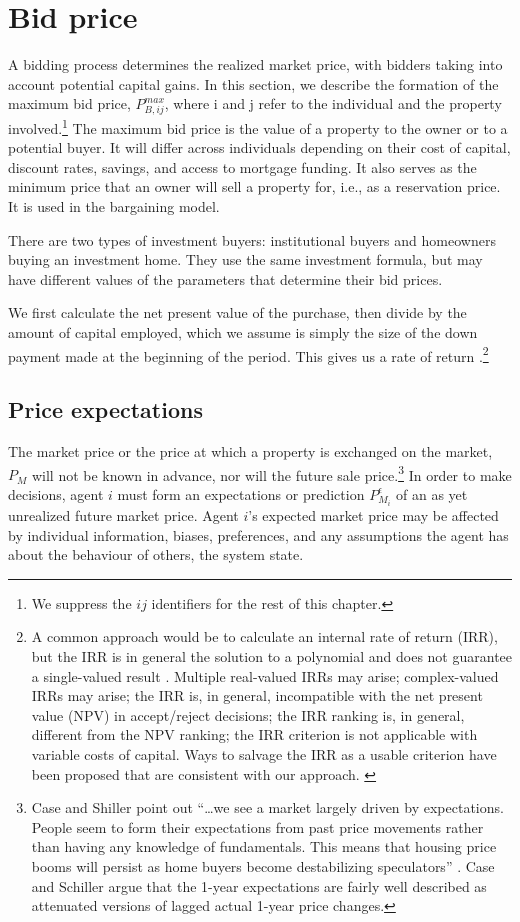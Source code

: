 \section{Bid price}\label{sec_model_bid_price}
A bidding process determines the realized market price, with bidders taking into account potential capital gains. In this section, we describe the formation of the maximum bid price, $P_{B,ij}^{max}$, where i and j refer to the individual and the property involved.\footnote{We suppress the $ij$ identifiers for the rest of this chapter. } The maximum bid price is the value of a property to the owner or to a potential buyer. It will differ across individuals depending on their cost of capital, discount rates,  savings, and access to mortgage funding. It also serves as the minimum price that an owner will sell a property for,  i.e., as a reservation price. It is used in the bargaining model.

There are two types of investment buyers: institutional buyers and homeowners buying an investment home. They use the same investment formula, but may have different values of the parameters that determine their bid prices.

We first calculate the net present value of the purchase, then divide by the amount of capital employed, which we assume is simply the size of the down payment made at the beginning of the period. This gives us a rate of return
.\footnote{A common approach would be to calculate an internal rate of return (IRR), but  the IRR is in general the solution to a polynomial and does not guarantee a single-valued result \cite{robinsonOptimalTerminationIRR1996}. 
Multiple real-valued  IRRs may arise;  complex-valued IRRs may arise;  the IRR is, in general, incompatible with the net present value (NPV) in accept/reject decisions; the IRR ranking is, in general, different from the NPV ranking; the IRR criterion is not applicable with variable costs of capital. Ways to salvage the IRR as a usable criterion have been proposed that are consistent with our approach. \cite{magniAverageInternalRate2010}} 


\subsection{Price expectations}
The \gls{market price} or the price at which a property is exchanged on the market, $P_M$ will not be known in advance, nor will the future sale price.\footnote{Case and Shiller point out ``\dots we see a market largely driven by expectations. People seem to form their expectations from past price movements rather than having any knowledge of fundamentals. This means that housing price booms will persist as home buyers become destabilizing speculators''  \cite{caseThereBubbleHousing2003}. Case and Schiller\cite{caseThereBubbleHousing2003} argue that  the 1-year expectations are fairly well described as attenuated versions of lagged actual 1-year price changes.}  In order to make decisions, agent $i$ must form an \glspl{expectation} or prediction $P_{M_i}^{\epsilon}$ of an as yet unrealized future market price. Agent $i$'s expected market price may be affected by individual information, biases, preferences, and any assumptions the agent has about the behaviour of others, the system state.  


